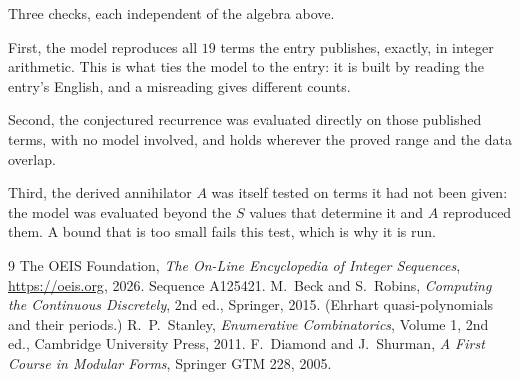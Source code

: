 \documentclass[11pt,a4paper]{article}
\theoremstyle{plain}
\theoremstyle{definition}
\begin{document}
Three checks, each independent of the algebra above.

First, the model reproduces all $19$ terms the entry publishes, exactly, in integer
arithmetic. This is what ties the model to the entry: it is built by reading the entry's
English, and a misreading gives different counts.

Second, the conjectured recurrence was evaluated directly on those published terms, with no
model involved, and holds wherever the proved range and the data overlap.

Third, the derived annihilator $A$ was itself tested on terms it had not been given: the model
was evaluated beyond the $S$ values that determine it and $A$ reproduced them. A bound that is
too small fails this test, which is why it is run.

\begin{thebibliography}{9}
 The OEIS Foundation, \emph{The On-Line Encyclopedia of Integer
Sequences}, \url{https://oeis.org}, 2026. Sequence A125421.
 M.~Beck and S.~Robins, \emph{Computing the Continuous Discretely},
2nd ed., Springer, 2015. (Ehrhart quasi-polynomials and their periods.)
 R.~P.~Stanley, \emph{Enumerative Combinatorics}, Volume 1, 2nd ed.,
Cambridge University Press, 2011.
 F.~Diamond and J.~Shurman, \emph{A First Course in Modular Forms},
Springer GTM 228, 2005.
\end{thebibliography}
\end{document}
